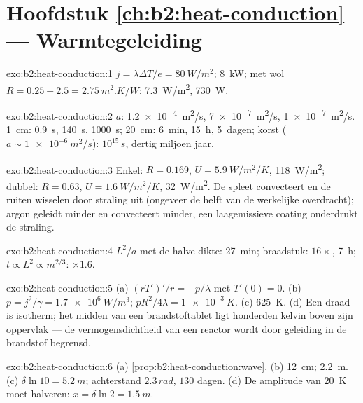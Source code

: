 \section*{Hoofdstuk \ref{ch:b2:heat-conduction} --- Warmtegeleiding}

\begin{solution}{exo:b2:heat-conduction:1}
$j = \lambda\Delta T/e = \qty{80}{W/m^2}$; \qty{8}{kW}; met wol
$R = 0.25 + 2.5 =
\qty{2.75}{m^2.K/W}$: \qty{7.3}{W/m^2}, \qty{730}{W}.
\end{solution}

\begin{solution}{exo:b2:heat-conduction:2}
$a$: \qty{1.2e-4}{m^2/s}, \qty{7e-7}{m^2/s}, \qty{1e-7}{m^2/s}. \qty{1}{cm}:
\qty{0.9}{s}, \qty{140}{s}, \qty{1000}{s}; \qty{20}{cm}: \qty{6}{min}, \qty{15}{h},
\qty{5}{dagen}; korst ($a \sim \qty{1e-6}{m^2/s}$): $10^{15}\,\unit{s}$, dertig
miljoen jaar.
\end{solution}

\begin{solution}{exo:b2:heat-conduction:3}
Enkel: $R = 0.169$, $U = \qty{5.9}{W/m^2/K}$, \qty{118}{W/m^2}; dubbel:
$R =
0.63$, $U = \qty{1.6}{W/m^2/K}$, \qty{32}{W/m^2}. De spleet convecteert
en de ruiten
wisselen door straling uit (ongeveer de helft van de werkelijke overdracht);
argon geleidt
minder en convecteert minder, een laagemissieve coating onderdrukt de
straling.
\end{solution}

\begin{solution}{exo:b2:heat-conduction:4}
$L^2/a$ met de halve dikte: \qty{27}{min}; braadstuk: $16\times$, \qty{7}{h};
$t \propto L^2 \propto m^{2/3}$: $\times 1.6$.
\end{solution}

\begin{solution}{exo:b2:heat-conduction:5}
(a) $(rT')'/r = -p/\lambda$ met $T'(0) = 0$. (b)
$p = j^2/\gamma = \qty{1.7e6}{W/m^3}$;
$pR^2/4\lambda = \qty{1e-3}{K}$. (c) \qty{625}{K}. (d) Een draad is
isotherm; het midden
van een brandstoftablet ligt honderden kelvin boven zijn oppervlak --- de
vermogensdichtheid van een reactor wordt door geleiding in de brandstof begrensd.
\end{solution}

\begin{solution}{exo:b2:heat-conduction:6}
(a) \cref{prop:b2:heat-conduction:wave}. (b) \qty{12}{cm}; \qty{2.2}{m}. (c)
$\delta\ln 10 = \qty{5.2}{m}$; achterstand $2.3\,\unit{rad}$, $130$ dagen. (d) De
amplitude van \qty{20}{K} moet halveren: $x = \delta\ln 2 = \qty{1.5}{m}$.
\end{solution}

